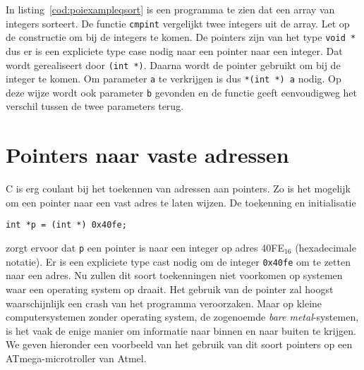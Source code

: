 In listing~\ref{cod:poiexampleqsort} is een programma te zien dat een array van integers sorteert. De functie \texttt{cmpint} vergelijkt twee integers uit de array. Let op de constructie om bij de integers te komen. De pointers zijn van het type \texttt{void~*} dus er is een expliciete type case nodig naar een pointer naar een integer. Dat wordt gerealiseert door \texttt{(int~*)}. Daarna wordt de pointer gebruikt om bij de integer te komen. Om parameter \texttt{a} te verkrijgen is dus \texttt{*(int~*)~a} nodig. Op deze wijze wordt ook parameter \texttt{b} gevonden en de functie geeft eenvoudigweg het verschil tussen de twee parameters terug.

%
%
%
%
%
%
%
%


\section{Pointers naar vaste adressen}
C is erg coulant bij het toekennen van adressen aan pointers. Zo is het mogelijk om een pointer naar een vast adres te laten wijzen.
De toekenning en initialisatie

\hspace*{1em}\lstinline|int *p = (int *) 0x40fe;|

zorgt ervoor dat \texttt{p} een pointer is naar een integer op adres 40FE$_{16}$ (hexadecimale notatie). Er is een expliciete type cast nodig om de integer \texttt{0x40fe} om te zetten naar een adres. Nu zullen dit soort toekenningen niet voorkomen op systemen waar een operating system op draait. Het gebruik van de pointer zal hoogst waarschijnlijk een crash van het programma veroorzaken. Maar op kleine computersystemen zonder operating system, de zogenoemde \textsl{bare metal}-systemen, is het vaak de enige manier om informatie naar binnen en naar buiten te krijgen. We geven hieronder een voorbeeld van het gebruik van dit soort pointers op een ATmega-microtroller van Atmel.

